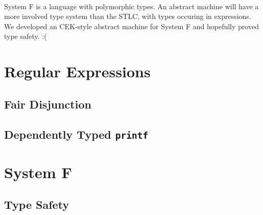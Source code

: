 \documentclass[12pt]{article}
\begin{document}
\paragraph{} System F is a language with polymorphic types. An abstract machine will have a more involved type system than the STLC, with types occuring in expressions. We developed an CEK-style abstract machine for System F and hopefully proved type safety. :(
\section{Regular Expressions}

\subsection{Fair Disjunction}

\subsection{Dependently Typed \texttt{printf}}

\section{System F}

\subsection{Type Safety}
\end{document}
